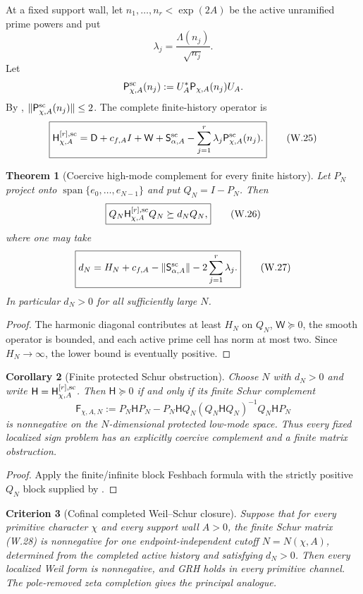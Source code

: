 \documentclass[11pt]{article}
\newtheorem{theorem}{Theorem}[section]
\newtheorem{corollary}[theorem]{Corollary}
\newtheorem{criterion}[theorem]{Criterion}
\theoremstyle{definition}
\theoremstyle{remark}
\newcommand{\Span}{\operatorname{span}}
\begin{document}
At a fixed support wall, let $n_1,\ldots,n_r<\exp(2A)$ be the active
unramified prime powers and put
\[
 \lambda_j=\frac{\Lambda(n_j)}{\sqrt{n_j}}.
\]
Let
\[
 \mathsf P_{\chi,A}^{\rm sc}(n_j)
 :=U_A^*\mathsf P_{\chi,A}(n_j)U_A.
\]
By ,
$\|\mathsf P_{\chi,A}^{\rm sc}(n_j)\|\le2$.
The complete finite-history operator is
\[
 \boxed{
 \mathsf H_{\chi,A}^{[r],\rm sc}
 =\mathsf D+c_{f,A}I+\mathsf W
  +\mathsf S_{\alpha,A}^{\rm sc}
  -\sum_{j=1}^r\lambda_j
   \mathsf P_{\chi,A}^{\rm sc}(n_j).}
 \tag{W.25}
\]

\begin{theorem}[Coercive high-mode complement for every finite history]
\label{thm:weil-high-mode}
Let $P_N$ project onto $\Span\{e_0,\ldots,e_{N-1}\}$ and put $Q_N=I-P_N$.
Then
\[
 \boxed{
 Q_N\mathsf H_{\chi,A}^{[r],\rm sc}Q_N
 \succeq d_NQ_N,}
 \tag{W.26}
\]
where one may take
\[
 \boxed{
 d_N=H_N+c_{f,A}
 -\|\mathsf S_{\alpha,A}^{\rm sc}\|
 -2\sum_{j=1}^r\lambda_j.}
 \tag{W.27}
\]
In particular $d_N>0$ for all sufficiently large $N$.
\end{theorem}

\begin{proof}
The harmonic diagonal contributes at least $H_N$ on $Q_N$,
$\mathsf W\succeq0$, the smooth operator is bounded, and each active prime
cell has norm at most two.  Since $H_N\to\infty$, the lower bound is eventually
positive.
\end{proof}

\begin{corollary}[Finite protected Schur obstruction]
\label{cor:weil-finite-Schur}
Choose $N$ with $d_N>0$ and write
$\mathsf H=\mathsf H_{\chi,A}^{[r],\rm sc}$.  Then
$\mathsf H\succeq0$ if and only if its finite Schur complement
\[
 \boxed{
 \mathsf F_{\chi,A,N}
 :=P_N\mathsf HP_N
  -P_N\mathsf HQ_N
   (Q_N\mathsf HQ_N)^{-1}
   Q_N\mathsf HP_N}
 \tag{W.28}
\]
is nonnegative on the $N$-dimensional protected low-mode space.  Thus every
fixed localized sign problem has an explicitly coercive complement and a
finite matrix obstruction.
\end{corollary}

\begin{proof}
Apply the finite/infinite block Feshbach formula with the strictly positive
$Q_N$ block supplied by .
\end{proof}

\begin{criterion}[Cofinal completed Weil--Schur closure]
\label{crit:weil-Schur-GRH}
Suppose that for every primitive character $\chi$ and every support wall
$A>0$, the finite Schur matrix \textup{(W.28)} is nonnegative for one
endpoint-independent cutoff $N=N(\chi,A)$, determined from the completed
active history and satisfying $d_N>0$.  Then every
localized Weil form is nonnegative, and GRH holds in every primitive channel.
The pole-removed zeta completion gives the principal analogue.
\end{criterion}
\end{document}
